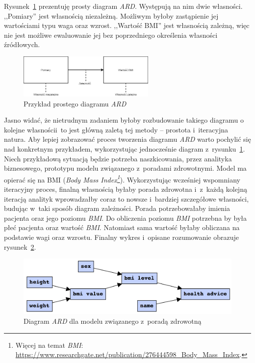 Rysunek~\ref{fig:ardExample} prezentuję prosty diagram \emph{ARD}. Występują na nim dwie własności. ,,Pomiary'' jest własnością niezależną. Możliwym byłoby zastąpienie jej wartościami typu waga oraz wzrost. ,,Wartość BMI'' jest własnością zależną, więc nie jest możliwe ewaluowanie jej bez poprzedniego określenia własności źródłowych.
\begin{figure}
    \centering
    \includegraphics[width=0.6\textwidth]{./assets/ardExample.png}
    \caption{Przykład prostego diagramu \emph{ARD}}
    \label{fig:ardExample}
\end{figure}

Jasno widać, że nietrudnym zadaniem byłoby rozbudowanie takiego diagramu o kolejne własności\linebreak i~to jest główną zaletą tej metody -- prostota i~iteracyjna natura. Aby lepiej zobrazować proces tworzenia diagramu \emph{ARD} warto pochylić się nad konkretnym przykładem, wykorzystując jednocześnie diagram z~rysunku~\ref{fig:ardExample}. Niech przykładową sytuacją będzie potrzeba naszkicowania, przez analityka biznesowego, prototypu modelu związanego z~poradami zdrowotnymi. Model ma opierać się na BMI (\emph{Body Mass Index\footnote{Więcej na temat \emph{BMI}: \url{https://www.researchgate.net/publication/276444598_Body_Mass_Index}.}}). Wykorzystując wcześniej wspomniany iteracyjny proces, finalną własnością byłaby porada zdrowotna i~z~każdą kolejną iteracją analityk wprowadzałby coraz to nowsze i~bardziej szczegółowe własności, budując w~taki sposób diagram zależności. Porada potrzebowałaby imienia pacjenta oraz jego poziomu \emph{BMI}. Do obliczenia poziomu \emph{BMI} potrzebna by była płeć pacjenta oraz wartość \emph{BMI}. Natomiast sama wartość byłaby obliczana na podstawie wagi oraz wzrostu. Finalny wykres i~opisane rozumowanie obrazuje rysunek~\ref{fig:ardComplexExample}.
\begin{figure}
    \centering
    \includegraphics[width=\textwidth]{./assets/ardComplexExample.png}
    \caption{Diagram \emph{ARD} dla modelu związanego z~poradą zdrowotną~\cite{ARDtoBPM}}
    \label{fig:ardComplexExample}
\end{figure}

